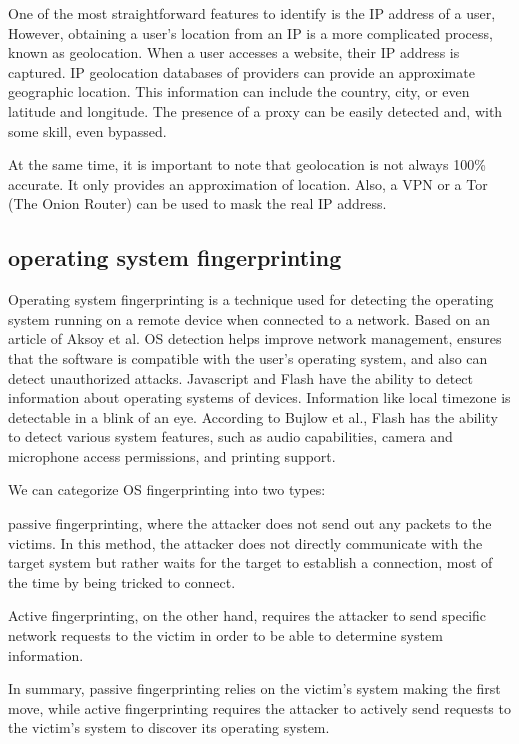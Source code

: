 \documentclass[10pt,a4paper,column]{article}
\begin{document}
One of the most straightforward features to identify is the IP address of a user, However, obtaining a user's location from an IP is a more complicated process, known as geolocation. When a user accesses a website, their IP address is captured. IP geolocation databases of providers can provide an approximate geographic location. This information can include the country, city, or even latitude and longitude. The presence of a proxy can be easily detected and, with some skill, even bypassed\cite{webtrackingMID}.

At the same time, it is important to note that geolocation is not always 100\% accurate. It only provides an approximation of location. Also, a VPN or a Tor (The Onion Router) can be used to mask the real IP address.

\subsection{operating system fingerprinting}
Operating system fingerprinting is a technique used for detecting the operating system running on a remote device when connected to a network. Based on an article\cite{OSfingvANTA} of Aksoy et al. OS detection helps improve network management, ensures that the software is compatible with the user's operating system, and also can detect unauthorized attacks. Javascript and Flash have the ability to detect information about operating systems of devices\cite{webtrackingMID}. Information like local timezone is detectable in a blink of an eye. According to Bujlow et al.\cite{webtrackingMID}, Flash has the ability to detect various system features, such as audio capabilities, camera and microphone access permissions, and printing support.

We can categorize OS fingerprinting into two types:\cite{OSfingerprinting}

passive fingerprinting, where the attacker does not send out any packets to the victims. In this method, the attacker does not directly communicate with the target system but rather waits for the target to establish a connection, most of the time by being tricked to connect.

Active fingerprinting, on the other hand, requires the attacker to send specific network requests to the victim in order to be able to determine system information.

In summary, passive fingerprinting relies on the victim's system making the first move, while active fingerprinting requires the attacker to actively send requests to the victim's system to discover its operating system.
 
\end{document}
